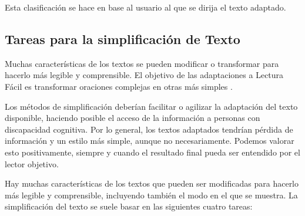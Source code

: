 Esta clasificación se hace en base al usuario al que se dirija el texto adaptado.



\subsection{Tareas para la simplificación de Texto}\label{subsec:tareas}

Muchas características de los textos se pueden modificar o transformar para hacerlo más legible y comprensible. El objetivo de las adaptaciones a Lectura Fácil es transformar oraciones complejas en otras más simples \citep{HoracioSaggion}. 




Los métodos de simplificación deberían facilitar o agilizar la adaptación del texto disponible, haciendo posible el acceso de la información a personas con discapacidad cognitiva. Por lo general, los textos adaptados tendrían pérdida de información y un estilo más simple, aunque no necesariamente. Podemos valorar esto positivamente, siempre y cuando el resultado final pueda ser entendido por el lector objetivo. 


Hay muchas características de los textos que pueden ser modificadas para hacerlo más legible y comprensible, incluyendo también el modo en el que se muestra. La simplificación del texto se suele basar en las siguientes cuatro tareas:  




